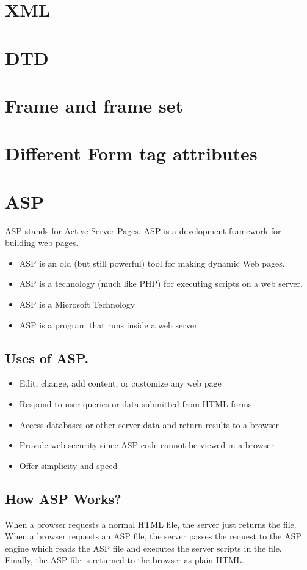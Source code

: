 \documentclass{article}
\begin{document}
\section{XML}
\section{DTD}
\section{Frame and frame set}
\section{Different Form tag attributes}

\section{ASP}
ASP stands for Active Server Pages. ASP is a development framework for building web pages.

\begin{itemize}
  \item ASP is an old (but still powerful) tool for making dynamic Web pages.
  \item ASP is a technology (much like PHP) for executing scripts on a web server.
  \item ASP is a Microsoft Technology
  \item ASP is a program that runs inside a web server
\end{itemize}

\subsection{Uses of ASP.}
\begin{itemize}
  \item Edit, change, add content, or customize any web page
  \item Respond to user queries or data submitted from HTML forms
  \item Access databases or other server data and return results to a browser
  \item Provide web security since ASP code cannot be viewed in a browser
  \item Offer simplicity and speed
\end{itemize}

\subsection{How ASP Works?}
When a browser requests a normal HTML file, the server just returns the file. When a browser requests an ASP file, the server passes the request to the ASP engine which reads the ASP file and executes the server scripts in the file. Finally, the ASP file is returned to the browser as plain HTML.
\end{document}
